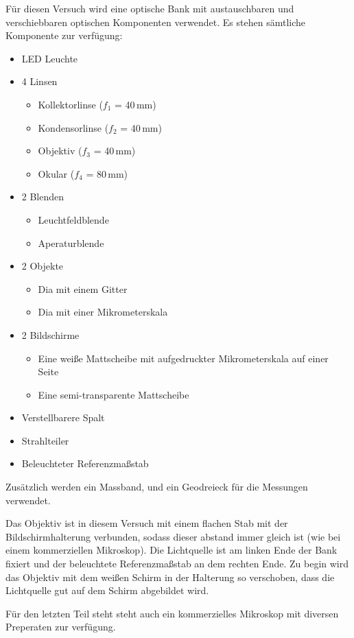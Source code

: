 \documentclass[11pt,a4paper]{article}
\begin{document}
Für diesen Versuch wird eine optische Bank mit austauschbaren und verschiebbaren optischen Komponenten verwendet. Es stehen sämtliche Komponente zur verfügung:
\begin{itemize}
	\item LED Leuchte
	\item 4 Linsen
	\begin{itemize}
		\item Kollektorlinse ($f_1$ = 40\,mm)
		\item Kondensorlinse ($f_2$ = 40\,mm)
		\item Objektiv ($f_3$ = 40\,mm)
		\item Okular ($f_4$ = 80\,mm)
	\end{itemize}
	\item 2 Blenden
	\begin{itemize}
		\item Leuchtfeldblende
		\item Aperaturblende
	\end{itemize}
	\item 2 Objekte
	\begin{itemize}
	\item Dia mit einem Gitter
	\item Dia mit einer Mikrometerskala
	\end{itemize}
	\item 2 Bildschirme
	\begin{itemize}
	\item Eine weiße Mattscheibe mit aufgedruckter Mikrometerskala auf einer Seite
	\item Eine semi-transparente Mattscheibe  
	\end{itemize}
	\item Verstellbarere Spalt
	\item Strahlteiler
	\item Beleuchteter Referenzmaßstab
\end{itemize}
Zusätzlich werden ein Massband, und ein Geodreieck für die Messungen verwendet. 

Das Objektiv ist in diesem Versuch mit einem flachen Stab mit der Bildschirmhalterung verbunden, sodass dieser abstand immer gleich ist (wie bei einem kommerziellen Mikroskop). Die Lichtquelle ist am linken Ende der Bank fixiert und der beleuchtete Referenzmaßstab an dem rechten Ende. Zu begin wird das Objektiv mit dem weißen Schirm in der Halterung so verschoben, dass die Lichtquelle gut auf dem Schirm abgebildet wird. 

Für den letzten Teil steht steht auch ein kommerzielles Mikroskop mit diversen Preperaten zur verfügung.
\end{document}
